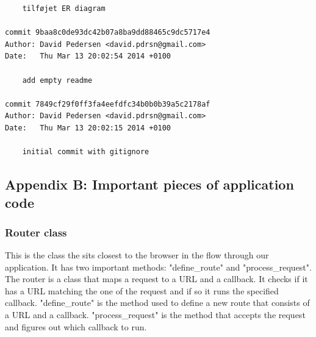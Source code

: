 \documentclass[12pt]{article}
\begin{document}
\begin{verbatim}
    tilføjet ER diagram

commit 9baa8c0de93dc42b07a8ba9dd88465c9dc5717e4
Author: David Pedersen <david.pdrsn@gmail.com>
Date:   Thu Mar 13 20:02:54 2014 +0100

    add empty readme

commit 7849cf29f0ff3fa4eefdfc34b0b0b39a5c2178af
Author: David Pedersen <david.pdrsn@gmail.com>
Date:   Thu Mar 13 20:02:15 2014 +0100

    initial commit with gitignore

\end{verbatim}
\subsection{Appendix B: Important pieces of application code}
\subsubsection{Router class}
This is the class the sits closest to the browser in the flow through our application. It has two important methods: "define\_route" and "process\_request". The router is a class that maps a request to a URL and a callback. It checks if it has a URL matching the one of the request and if so it runs the specified callback.
\newline
"define\_route" is the method used to define a new route that consists of a URL and a callback. "process\_request" is the method that accepts the request and figures out which callback to run.
\end{document}
